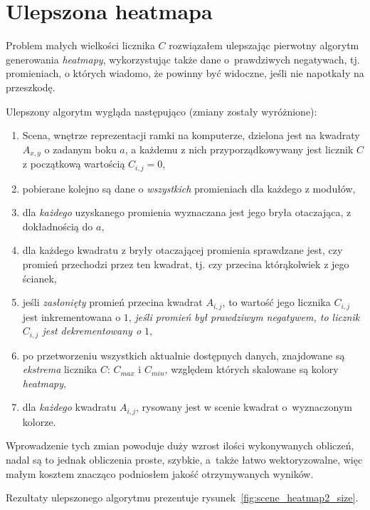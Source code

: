\section{Ulepszona heatmapa}

Problem małych wielkości licznika $C$ rozwiązałem ulepszając pierwotny algorytm generowania \textit{heatmapy}, wykorzystując także dane o~prawdziwych negatywach, tj. promieniach, o których wiadomo, że powinny być widoczne, jeśli nie napotkały na przeszkodę.

Ulepszony algorytm wygląda następująco (zmiany zostały wyróżnione):
\begin{enumerate}
 \item Scena, wnętrze reprezentacji ramki na komputerze, dzielona jest na kwadraty $A_{x,y}$ o zadanym boku $a$, a każdemu z nich przyporządkowywany jest licznik $C$ z początkową wartością $C_{i,j} = 0$,
 \item pobierane kolejno są dane o \textit{wszystkich} promieniach dla każdego z modułów,
 \item dla \textit{każdego} uzyskanego promienia wyznaczana jest jego bryła otaczająca, z dokładnością do $a$,
 \item dla każdego kwadratu z bryły otaczającej promienia sprawdzane jest, czy promień przechodzi przez ten kwadrat, tj. czy przecina którąkolwiek z jego ścianek,
 \item jeśli \textit{zasłonięty} promień przecina kwadrat $A_{i,j}$, to wartość jego licznika $C_{i,j}$ jest inkrementowana o $1$, \textit{jeśli promień był prawdziwym negatywem, to licznik $C_{i,j}$ jest dekrementowany o $1$},
 \item po przetworzeniu wszystkich aktualnie dostępnych danych, znajdowane są \textit{ekstrema} licznika $C$: $C_{max}$ i $C_{min}$, względem których skalowane są kolory \textit{heatmapy},
 \item dla \textit{każdego} kwadratu $A_{i,j}$, rysowany jest w scenie kwadrat o~wyznaczonym kolorze.\\
\end{enumerate}

Wprowadzenie tych zmian powoduje duży wzrost ilości wykonywanych obliczeń, nadal są to jednak obliczenia proste, szybkie, a~także łatwo wektoryzowalne, więc małym kosztem znacząco podniosłem jakość otrzymywanych wyników.

Rezultaty ulepszonego algorytmu prezentuje rysunek~\ref{fig:scene_heatmap2_size}.

